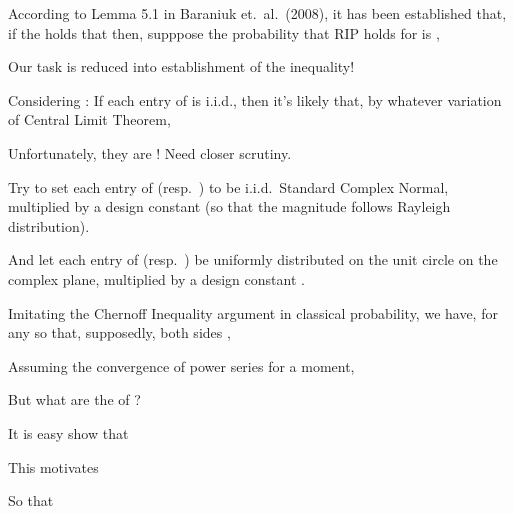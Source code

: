 {

\I According to Lemma 5.1 in Baraniuk et.\ al.\ (2008), it has been established that, if the  holds that
\I then, supppose the probability that RIP holds for  is ,

\I Our task is reduced into establishment of the inequality!
}
{
\I Considering : If each entry of  is i.i.d., then it's likely that, by whatever variation of Central Limit Theorem,

\I Unfortunately, they are !
\m {\Rightarrow} Need closer scrutiny.

\I Try to set each entry of  (resp.\ ) to be i.i.d.\ Standard Complex Normal, multiplied by a design constant  (so that the magnitude follows Rayleigh distribution).

\I And let each entry of  (resp.\ ) be uniformly distributed on the unit circle on the complex plane, multiplied by a design constant .
}
{
\I Imitating the Chernoff Inequality argument in classical probability, we have, for any  so that, supposedly, both sides \m {< \infty},

\I Assuming the convergence of power series for a moment,

\I But what are the  of \m {\rho}?
}
{
\I It is easy show that

\I This motivates

\I So that
}
